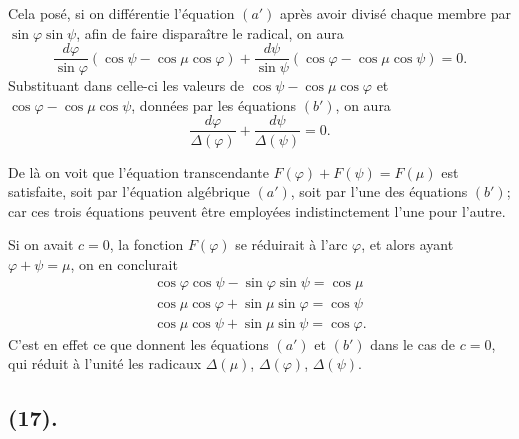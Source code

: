 \documentclass{article}
\begin{document}
Cela posé, si on différentie l'équation $(a')$ après avoir divisé chaque membre par $\sin\varphi\sin\psi$, afin de faire disparaître le radical, on aura
\[ \frac{d\varphi}{\sin\varphi}(\cos\psi-\cos\mu\cos\varphi)+\frac{d\psi}{\sin\psi}(\cos\varphi-\cos\mu\cos\psi)=0. \]
Substituant dans celle-ci les valeurs de $\cos\psi-\cos\mu\cos\varphi$ et $\cos\varphi-\cos\mu\cos\psi$, données par les équations $(b')$, on aura
\[ \frac{d\varphi}{\Delta(\varphi)}+\frac{d\psi}{\Delta(\psi)}=0. \]

De là on voit que l'équation transcendante $F(\varphi)+F(\psi)=F(\mu)$ est satisfaite, soit par l'équation algébrique $(a')$, soit par l'une des équations $(b')$; car ces trois équations peuvent être employées indistinctement l'une pour l'autre.

Si on avait $c=0$, la fonction $F(\varphi)$ se réduirait à l'arc $\varphi$, et alors ayant $\varphi+\psi=\mu$, on en conclurait
\[ \begin{gathered} \cos\varphi\cos\psi-\sin\varphi\sin\psi=\cos\mu\\ \cos\mu\cos\varphi+\sin\mu\sin\varphi=\cos\psi\\ \cos\mu\cos\psi+\sin\mu\sin\psi=\cos\varphi. \end{gathered} \]
C'est en effet ce que donnent les équations $(a')$ et $(b')$ dans le cas de $c=0$, qui réduit à l'unité les radicaux $\Delta(\mu)$, $\Delta(\varphi)$, $\Delta(\psi)$.

\subsection*{(17).}

\end{document}
